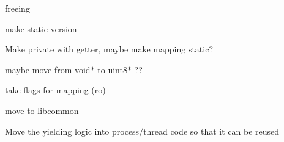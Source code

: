 \begin{DoxyRefList}
%
freeing 
\item[Member \doxylink{classMaxOS_1_1memory_1_1PhysicalMemoryManager_af43b96063c89e26eecb6aa9c8e46f4fb}{Max\+OS\+::memory\+::Physical\+Memory\+Manager\+::get\+\_\+physical\+\_\+address} (virtual\+\_\+address\+\_\+t \texorpdfstring{$\ast$}{*}virtual\+\_\+address, uint64\+\_\+t \texorpdfstring{$\ast$}{*}pml4\+\_\+root)]\label{todo__todo000034}%
%
make static version  
\item[Member \doxylink{classMaxOS_1_1memory_1_1PhysicalMemoryManager_aac616421554f724ac8810d5bff76c3f1}{Max\+OS\+::memory\+::Physical\+Memory\+Manager\+::s\+\_\+current\+\_\+manager} ]\label{todo__todo000014}%
%
Make private with getter, maybe make mapping static?  
\item[Member \doxylink{classMaxOS_1_1memory_1_1VirtualMemoryManager_ac6a5d68d672a0e88a09d3a9abc71c6f7}{Max\+OS\+::memory\+::Virtual\+Memory\+Manager\+::load\+\_\+range\+\_\+from\+\_\+process} (\doxylink{classMaxOS_1_1memory_1_1VirtualMemoryManager}{Virtual\+Memory\+Manager} \texorpdfstring{$\ast$}{*}other\+\_\+vmm, const void \texorpdfstring{$\ast$}{*}start\+\_\+address, size\+\_\+t size)]\label{todo__todo000038}%
%
maybe move from void\texorpdfstring{$\ast$}{*} to uint8\texorpdfstring{$\ast$}{*} ?? 



take flags for mapping (ro)  
\item[Class \doxylink{classMaxOS_1_1processes_1_1BlockingLock}{Max\+OS\+::processes\+::Blocking\+Lock} ]\label{todo__todo000016}%
%
move to libcommon  
\item[Member \doxylink{classMaxOS_1_1processes_1_1BlockingLock_a24c5d9622cba654d5fe9f0847dc69e6a}{Max\+OS\+::processes\+::Blocking\+Lock\+::acquire} ()]\label{todo__todo000040}%
%
Move the yielding logic into process/thread code so that it can be reused 




\end{DoxyRefList}

